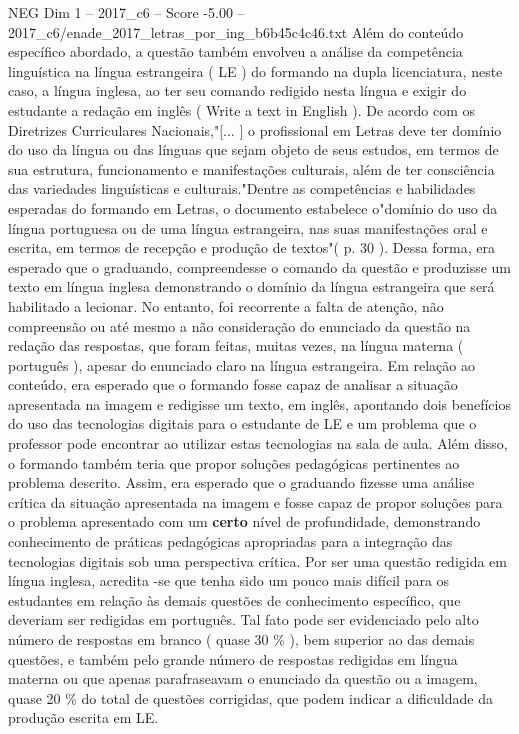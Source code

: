 \begin{textsample}{NEG Dim 1 – 2017\_c6 – Score -5.00 – 2017\_c6/enade\_2017\_letras\_por\_ing\_b6b45c4c46.txt}
Além do conteúdo específico abordado, a questão também envolveu a análise da competência linguística na língua estrangeira ( LE ) do formando na dupla licenciatura, neste caso, a língua inglesa, ao ter seu comando redigido nesta língua e exigir do estudante a redação em inglês ( Write a text in English ).
De acordo com os Diretrizes Curriculares Nacionais,"[... ] o profissional em Letras deve ter domínio do uso da língua ou das línguas que sejam objeto de seus estudos, em termos de sua estrutura, funcionamento e manifestações culturais, além de ter consciência das variedades linguísticas e culturais."Dentre as competências e habilidades esperadas do formando em Letras, o documento estabelece o"domínio do uso da língua portuguesa ou de uma língua estrangeira, nas suas manifestações oral e escrita, em termos de recepção e produção de textos"( p. 30 ).
Dessa forma, era esperado que o graduando, compreendesse o comando da questão e produzisse um texto em língua inglesa demonstrando o domínio da língua estrangeira que será habilitado a lecionar.
No entanto, foi recorrente a falta de atenção, não compreensão ou até mesmo a não consideração do enunciado da questão na redação das respostas, que foram feitas, muitas vezes, na língua materna ( português ), apesar do enunciado claro na língua estrangeira.
Em relação ao conteúdo, era esperado que o formando fosse capaz de analisar a situação apresentada na imagem e redigisse um texto, em inglês, apontando dois benefícios do uso das tecnologias digitais para o estudante de LE e um problema que o professor pode encontrar ao utilizar estas tecnologias na sala de aula.
Além disso, o formando também teria que propor soluções pedagógicas pertinentes ao problema descrito.
Assim, era esperado que o graduando fizesse uma análise crítica da situação apresentada na imagem e fosse capaz de propor soluções para o problema apresentado com um \textbf{certo} nível de profundidade, demonstrando conhecimento de práticas pedagógicas apropriadas para a integração das tecnologias digitais sob uma perspectiva crítica.
Por ser uma questão redigida em língua inglesa, acredita -se que tenha sido um pouco mais difícil para os estudantes em relação às demais questões de conhecimento específico, que deveriam ser redigidas em português.
Tal fato pode ser evidenciado pelo alto número de respostas em branco ( quase 30 \% ), bem superior ao das demais questões, e também pelo grande número de respostas redigidas em língua materna ou que apenas parafraseavam o enunciado da questão ou a imagem, quase 20 \% do total de questões corrigidas, que podem indicar a dificuldade da produção escrita em LE.

\end{textsample}
